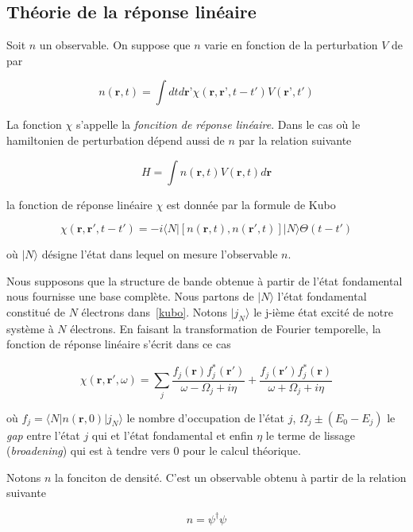 \documentclass[12pt, french]{report}
\theoremstyle{theoreme}
\begin{document}
\subsection{Théorie de la réponse linéaire}
Soit $n$ un observable. On suppose que $n$ varie en fonction de la perturbation $V$ de par

$$
n(\textbf{r}, t) = \int dt d\textbf{r'}  \chi (\textbf{r}, \textbf{r'}, t-t') V(\textbf{r'}, t')
$$

La fonction $\chi$ s'appelle la \textit{foncition de réponse linéaire}. Dans le cas où le hamiltonien de perturbation dépend aussi de $n$ par la relation suivante

$$
H = \int n(\textbf{r}, t) V(\textbf{r}, t) d\textbf{r}
$$

la fonction de réponse linéaire $\chi$ est donnée par la formule de Kubo\cite{Ton12}

\begin{equation}\label{kubo}
  \chi (\textbf{r}, \textbf{r}', t-t') = -i \langle N | [n(\textbf{r}, t), n(\textbf{r}', t)] |N \rangle \Theta(t-t')
\end{equation}

où $|N \rangle $ désigne l'état dans lequel on mesure l'observable $n$.

Nous supposons que la structure de bande obtenue à partir de l'état fondamental nous fournisse une base complète. Nous partons de $|N \rangle$ l'état fondamental constitué de $N$ électrons dans~\ref{kubo}. Notons $| j_N \rangle $ le j-ième état excité de notre système à $N$ électrons. En faisant la transformation de Fourier temporelle, la fonction de réponse linéaire s'écrit dans ce cas

\begin{equation}
\chi (\textbf{r}, \textbf{r}', \omega) = \sum_j \frac{f_j(\textbf{r}) f_j^*(\textbf{r}') }{\omega - \Omega_j + i \eta} + \frac{f_j(\textbf{r}') f_j^*(\textbf{r}) }{\omega + \Omega_j + i \eta}
\end{equation}

où $f_j = \langle N | n(\textbf{r}, 0) | j_N \rangle$ le nombre d'occupation de l'état $j$, $\Omega_j \pm (E_0 - E_j)$ le \textit{gap} entre l'état $j$ qui et l'état fondamental et enfin $\eta$ le terme de lissage (\textit{broadening}) qui est à tendre vers 0 pour le calcul théorique.

Notons $n$ la fonciton de densité. C'est un observable obtenu à partir de la relation suivante

$$
n = \psi^\dagger \psi
$$
\end{document}
